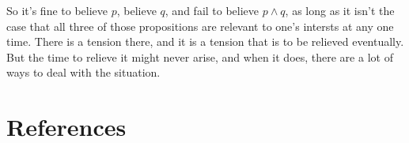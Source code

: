 \documentclass[11pt,]{book}
\begin{document}
So it's fine to believe \(p\), believe \(q\), and fail to believe \(p \wedge q\), as long as it isn't the case that all three of those propositions are relevant to one's intersts at any one time. There is a tension there, and it is a tension that is to be relieved eventually. But the time to relieve it might never arise, and when it does, there are a lot of ways to deal with the situation.

\hypertarget{references}{%
\chapter*{References}\label{references}}


\end{document}
